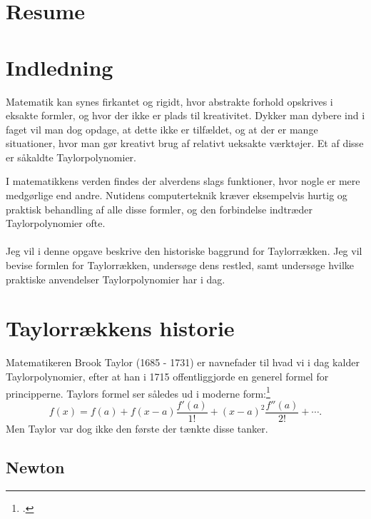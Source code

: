 \documentclass[12pt, a4paper]{article}
\begin{document}
\section*{Resume} %
\blindtext[1-2]
\tableofcontents
\newpage



\section{Indledning} %
Matematik kan synes firkantet og rigidt, hvor abstrakte forhold opskrives i eksakte formler, og hvor der ikke er plads til kreativitet. 
Dykker man dybere ind i faget vil man dog opdage, at dette ikke er tilfældet, og at der er mange situationer, hvor man gør kreativt brug af relativt ueksakte værktøjer. Et af disse er såkaldte Taylorpolynomier.


I matematikkens verden findes der alverdens slags funktioner, hvor nogle er mere medgørlige end andre. Nutidens computerteknik kræver eksempelvis hurtig og praktisk behandling af alle disse formler, og den forbindelse indtræder Taylorpolynomier ofte.\\
\\
Jeg vil i denne opgave beskrive den historiske baggrund for Taylorrækken. Jeg vil bevise formlen for Taylorrækken, undersøge dens restled, samt undersøge hvilke praktiske anvendelser Taylorpolynomier har i dag.

\section{Taylorrækkens historie} %
Matematikeren Brook Taylor (1685 - 1731) er navnefader til hvad vi i dag kalder Taylorpolynomier, efter at han i 1715 offentliggjorde en generel formel for principperne.
Taylors formel ser således ud i moderne form:\footcite[s. 247]{roy_2021}
\begin{equation}
   f(x)=f(a)+f(x-a)\frac{f'(a)}{1!}+(x-a)^2\frac{f''(a)}{2!}+\cdots. 
\end{equation}
Men Taylor var dog ikke den første der tænkte disse tanker.
\subsection{Newton}
\end{document}
